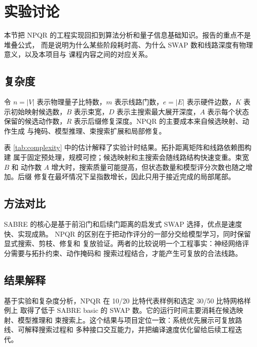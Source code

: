 \section{实验讨论}

本节把 NPQR 的工程实现回扣到算法分析和量子信息基础知识。报告的重点不是堆叠公式，
而是说明为什么某些阶段耗时高、为什么 SWAP 数和线路深度有物理意义，以及本项目与
课程内容之间的对应关系。

\subsection{复杂度}

令 $n=|V|$ 表示物理量子比特数，$m$ 表示线路门数，$e=|E|$ 表示硬件边数，$K$
表示初始映射候选数，$B$ 表示束宽，$D$ 表示主搜索最大展开深度，$A$ 表示每个状态
保留的候选动作数，$R$ 表示后缀修复深度。NPQR 的主要成本来自候选映射、动作生成
与掩码、模型推理、束搜索扩展和局部修复。



表 \ref{tab:complexity} 中的估计解释了实验计时结果。拓扑距离矩阵和线路依赖图构建
属于固定预处理，规模可控；候选映射和主搜索会随线路结构快速变重。束宽 $B$ 和
动作数 $A$ 增大时，搜索质量可能提高，但状态数量和模型评分次数也随之增加。后缀
修复在最坏情况下呈指数增长，因此只用于接近完成的局部尾部。

\subsection{方法对比}



SABRE 的核心是基于前沿门和后续门距离的启发式 SWAP 选择，优点是速度快、实现成熟。
NPQR 的区别在于把动作评分的一部分交给模型学习，同时保留显式搜索、剪枝、修复和
复放验证。两者的比较说明一个工程事实：神经网络评分需要与拓扑约束、动作掩码和
搜索过程结合，才能产生可复放的合法线路。

\subsection{结果解释}

基于实验和复杂度分析，NPQR 在 10/20 比特代表样例和选定 30/50 比特网格样例上
取得了低于 SABRE basic 的 SWAP 数。它的运行时间主要消耗在候选映射、模型推理和
束搜索上。这个结果与项目定位一致：系统优先展示可复放路线、可解释搜索过程和
多种接口交互能力，并把编译速度优化留给后续工程迭代。
